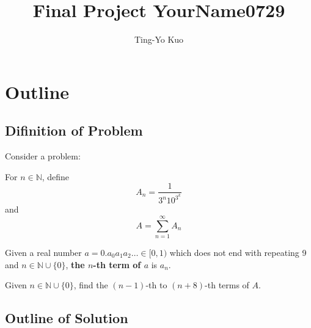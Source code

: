 \documentclass[paper=a4]{scrartcl}
\title{Final Project YourName0729}
\author{Ting-Yo Kuo}
\date{}
\begin{document}
\maketitle
\setcounter{section}{0}
\section{Outline}
\subsection{Difinition of Problem}
Consider a problem:

\begin{tcolorbox}[arc=0pt,colback=white,title={Definition}]
For $n\in\mathbb{N}$, define 
\[
A_n=\frac{1}{3^n10^{3^k}}
\]
and
\[
A=\sum_{n=1}^\infty A_n
\]
\end{tcolorbox}
\begin{tcolorbox}[arc=0pt,colback=white,title={Definition}]
Given a real number $a=0.a_0a_1a_2\ldots\in[0,1)$ which does not end with repeating 9 and $n\in\mathbb{N}\cup\{0\}$, \textbf{the $n$-th term of $a$} is $a_n$.
\end{tcolorbox}
\begin{tcolorbox}[arc=0pt,colback=white,title={Problem}]
Given $n\in\mathbb{N}\cup\{0\}$, find the $(n-1)$-th to $(n+8)$-th terms of $A$.
\end{tcolorbox}

\subsection{Outline of Solution}
\end{document}
